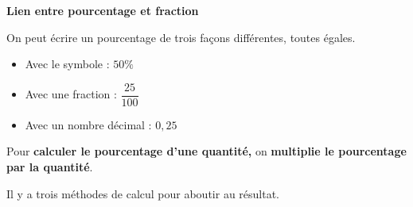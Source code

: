 \documentclass[a4paper]{book}
\begin{document}
    \begin{remarque}
        \textbf{Lien entre pourcentage et fraction}

        On peut écrire un pourcentage de trois façons différentes, toutes égales.
        
        \begin{itemize}
            \item Avec le symbole : $50 \%$
            \item Avec une fraction : $\dfrac{25}{100}$
            \item Avec un nombre décimal : $0,25$
        \end{itemize}
    \end{remarque}
    

\newpage


    \begin{propriete}
        Pour \textbf{calculer le pourcentage d'une quantité,} on \textbf{multiplie le pourcentage par la quantité}.

        Il y a trois méthodes de calcul pour aboutir au résultat.
    \end{propriete}
\end{document}
